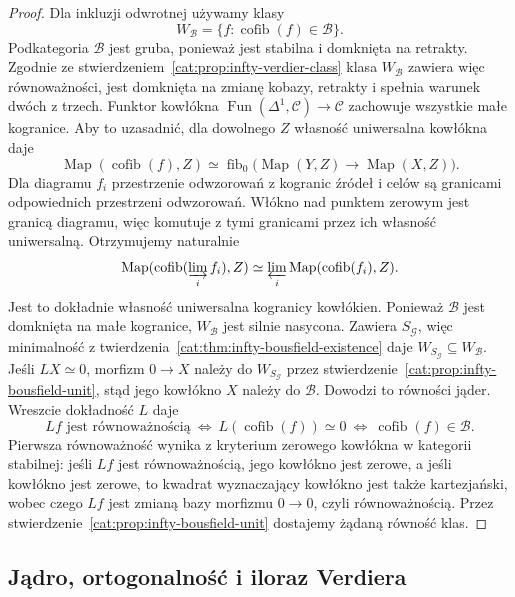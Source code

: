 \begin{proof}
Dla inkluzji odwrotnej używamy klasy
\[
 W_{\mathcal B}=\{f:\operatorname{cofib}(f)\in\mathcal B\}.
\]
Podkategoria $\mathcal B$ jest gruba, ponieważ jest stabilna i domknięta na retrakty. Zgodnie ze stwierdzeniem~\ref{cat:prop:infty-verdier-class} klasa $W_{\mathcal B}$ zawiera więc równoważności, jest domknięta na zmianę kobazy, retrakty i spełnia warunek dwóch z trzech. Funktor kowłókna $\operatorname{Fun}(\Delta^1,\mathcal C)\to\mathcal C$ zachowuje wszystkie małe kogranice. Aby to uzasadnić, dla dowolnego $Z$ własność uniwersalna kowłókna daje
\[
 \operatorname{Map}(\operatorname{cofib}(f),Z)
 \simeq \operatorname{fib}_0\bigl(\operatorname{Map}(Y,Z)\to\operatorname{Map}(X,Z)\bigr).
\]
Dla diagramu $f_i$ przestrzenie odwzorowań z kogranic źródeł i celów są granicami odpowiednich przestrzeni odwzorowań. Włókno nad punktem zerowym jest granicą diagramu, więc komutuje z tymi granicami przez ich własność uniwersalną. Otrzymujemy naturalnie
\[
 \operatorname{Map}(\operatorname{cofib}(\varinjlim_i f_i),Z)
 \simeq \varprojlim_i\operatorname{Map}(\operatorname{cofib}(f_i),Z).
\]
Jest to dokładnie własność uniwersalna kogranicy kowłókien. Ponieważ $\mathcal B$ jest domknięta na małe kogranice, $W_{\mathcal B}$ jest silnie nasycona. Zawiera $S_{\mathcal G}$, więc minimalność z twierdzenia~\ref{cat:thm:infty-bousfield-existence} daje $W_{S_{\mathcal G}}\subseteq W_{\mathcal B}$. Jeśli $LX\simeq0$, morfizm $0\to X$ należy do $W_{S_{\mathcal G}}$ przez stwierdzenie~\ref{cat:prop:infty-bousfield-unit}, stąd jego kowłókno $X$ należy do $\mathcal B$. Dowodzi to równości jąder. Wreszcie dokładność $L$ daje
\[
 Lf\text{ jest równoważnością}
 \ \Longleftrightarrow\
 L(\operatorname{cofib}(f))\simeq0
 \ \Longleftrightarrow\
 \operatorname{cofib}(f)\in\mathcal B.
\]
Pierwsza równoważność wynika z kryterium zerowego kowłókna w kategorii stabilnej: jeśli $Lf$ jest równoważnością, jego kowłókno jest zerowe, a jeśli kowłókno jest zerowe, to kwadrat wyznaczający kowłókno jest także kartezjański, wobec czego $Lf$ jest zmianą bazy morfizmu $0\to0$, czyli równoważnością. Przez stwierdzenie~\ref{cat:prop:infty-bousfield-unit} dostajemy żądaną równość klas.
\end{proof}

\subsection{Jądro, ortogonalność i iloraz Verdiera}

